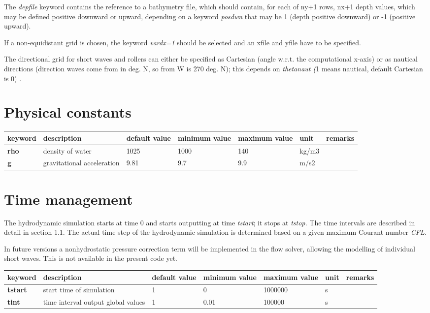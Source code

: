 The \textit{depfile} keyword contains the reference to a bathymetry file, which should contain, for each of ny+1 rows, nx+1 depth values, which may be defined positive downward or upward, depending on a keyword \textit{posdwn} that may be 1 (depth positive downward) or -1 (positive upward).

If a non-equidistant grid is chosen, the keyword \textit{vardx=1} should be selected and an xfile and yfile have to be specified.

The directional grid for short waves and rollers can either be specified as Cartesian (angle w.r.t. the computational x-axis) or as nautical directions (direction waves come from in deg. N, so from W is 270 deg. N); this depends on \textit{thetanaut (}1 means nautical, default Cartesian is 0) .


\section{Physical constants}

\begin{tabular}{|p{0.5in}|p{0.8in}|p{0.4in}|p{0.5in}|p{0.5in}|p{0.4in}|p{0.6in}|} \hline 
keyword & description & default value & minimum value & maximum value & unit & remarks \\ \hline 
\textbf{rho} & density of water & 1025 & 1000 & 140 & kg/m3 &  \\ \hline 
\textbf{g} & gravitational acceleration & 9.81 & 9.7 & 9.9 & m/s2 &  \\ \hline 
\end{tabular}


\section{Time management}

The hydrodynamic simulation starts at time 0 and starts outputting at time \textit{tstart}; it stops at \textit{tstop.} The time intervals are described in detail in section 1.1. The actual time step of the hydrodynamic simulation is determined based on a given maximum Courant number \textit{CFL. }

In future versions a nonhydrostatic pressure correction term will be implemented in the flow solver, allowing the modelling of individual short waves. This is not available in the present code yet.

\begin{tabular}{|p{0.5in}|p{0.9in}|p{0.4in}|p{0.5in}|p{0.5in}|p{0.4in}|p{0.7in}|} \hline 
keyword & description & default value & minimum value & maximum value & unit & remarks \\ \hline 
\textbf{tstart  } & start time of simulation & 1 & 0 & 1000000 & s &  \\ \hline 
\textbf{tint    } & time interval output global values & 1 & 0.01 & 100000 & s &  \\ \hline 
\end{tabular}

